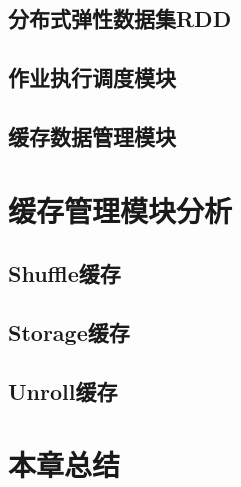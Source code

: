 \subsection{分布式弹性数据集RDD}
\subsection{作业执行调度模块}
\subsection{缓存数据管理模块}
\section{缓存管理模块分析}
\subsection{Shuffle缓存}
\subsection{Storage缓存}
\subsection{Unroll缓存}
\section{本章总结}




